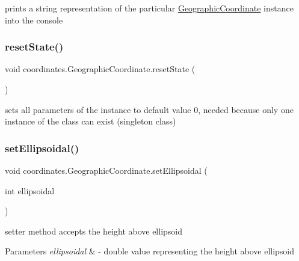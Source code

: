 prints a string representation of the particular \hyperlink{classcoordinates_1_1_geographic_coordinate}{Geographic\+Coordinate} instance into the console 

\mbox{\label{classcoordinates_1_1_geographic_coordinate_ae489c187a21fc058b5af3d7d7ff1e5e7}} 
\subsubsection{\texorpdfstring{reset\+State()}{resetState()}}
{\footnotesize\ttfamily void coordinates.\+Geographic\+Coordinate.\+reset\+State (\begin{DoxyParamCaption}{ }\end{DoxyParamCaption})\hspace{0.3cm}{\ttfamily [private]}}



sets all parameters of the instance to default value 0, needed because only one instance of the class can exist (singleton class) 

\mbox{\label{classcoordinates_1_1_geographic_coordinate_a1c76ad1e5e1cd8c9ff738d3cdf1c4d0a}} 
\subsubsection{\texorpdfstring{set\+Ellipsoidal()}{setEllipsoidal()}}
{\footnotesize\ttfamily void coordinates.\+Geographic\+Coordinate.\+set\+Ellipsoidal (\begin{DoxyParamCaption}\item[{int}]{ellipsoidal }\end{DoxyParamCaption})}



setter method accepts the height above ellipsoid 


\begin{DoxyParams}{Parameters}
{\em ellipsoidal} & -\/ double value representing the height above ellipsoid \\
\hline
\end{DoxyParams}
\mbox{\label{classcoordinates_1_1_geographic_coordinate_ab4d53507e2fb93d1e16bffffcf21ecb4}} 
